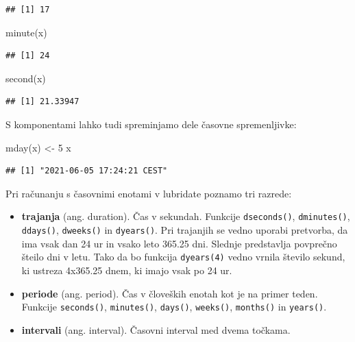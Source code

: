 \documentclass[
]{book}
\newenvironment{Shaded}{\begin{snugshade}}{\end{snugshade}}
\newcommand{\DecValTok}[1]{\textcolor[rgb]{0.00,0.00,0.81}{#1}}
\newcommand{\FunctionTok}[1]{\textcolor[rgb]{0.00,0.00,0.00}{#1}}
\newcommand{\NormalTok}[1]{#1}
\newcommand{\OtherTok}[1]{\textcolor[rgb]{0.56,0.35,0.01}{#1}}
\providecommand{\tightlist}{%
  \setlength{\itemsep}{0pt}\setlength{\parskip}{0pt}}
\begin{document}
\begin{verbatim}
## [1] 17
\end{verbatim}

\begin{Shaded}
\begin{Highlighting}[]
\FunctionTok{minute}\NormalTok{(x)}
\end{Highlighting}
\end{Shaded}

\begin{verbatim}
## [1] 24
\end{verbatim}

\begin{Shaded}
\begin{Highlighting}[]
\FunctionTok{second}\NormalTok{(x)}
\end{Highlighting}
\end{Shaded}

\begin{verbatim}
## [1] 21.33947
\end{verbatim}

S komponentami lahko tudi spreminjamo dele časovne spremenljivke:

\begin{Shaded}
\begin{Highlighting}[]
\FunctionTok{mday}\NormalTok{(x) }\OtherTok{\textless{}{-}} \DecValTok{5}
\NormalTok{x}
\end{Highlighting}
\end{Shaded}

\begin{verbatim}
## [1] "2021-06-05 17:24:21 CEST"
\end{verbatim}

Pri računanju s časovnimi enotami v lubridate poznamo tri razrede:

\begin{itemize}
\tightlist
\item
  \textbf{trajanja} (ang. duration). Čas v sekundah. Funkcije \texttt{dseconds()}, \texttt{dminutes()}, \texttt{ddays()}, \texttt{dweeks()} in \texttt{dyears()}. Pri trajanjih se vedno uporabi pretvorba, da ima vsak dan 24 ur in vsako leto 365.25 dni. Slednje predstavlja povprečno šteilo dni v letu. Tako da bo funkcija \texttt{dyears(4)} vedno vrnila število sekund, ki ustreza 4x365.25 dnem, ki imajo vsak po 24 ur.
\item
  \textbf{periode} (ang. period). Čas v človeških enotah kot je na primer teden. Funkcije \texttt{seconds()}, \texttt{minutes()}, \texttt{days()}, \texttt{weeks()}, \texttt{months()} in \texttt{years()}.
\item
  \textbf{intervali} (ang. interval). Časovni interval med dvema točkama.
\end{itemize}
\end{document}
